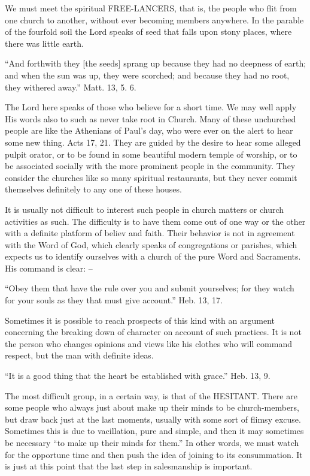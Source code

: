 \documentclass[
]{book}
\begin{document}
We must meet the spiritual FREE-LANCERS, that is, the people who flit from one church to another, without ever becoming members anywhere. In the parable of the fourfold soil the Lord speaks of seed that falls upon stony places, where there was little earth.

``And forthwith they {[}the seeds{]} sprang up because they had no deepness of earth; and when the sun was up, they were scorched; and because they had no root, they withered away.'' Matt. 13, 5. 6.

The Lord here speaks of those who believe for a short time. We may well apply His words also to such as never take root in Church. Many of these unchurched people are like the Athenians of Paul's day, who were ever on the alert to hear some new thing. Acts 17, 21. They are guided by the desire to hear some alleged pulpit orator, or to be found in some beautiful modern temple of worship, or to be associated socially with the more prominent people in the community. They consider the churches like so many spiritual restaurants, but they never commit themselves definitely to any one of these houses.

It is usually not difficult to interest such people in church matters or church activities as such. The difficulty is to have them come out of one way or the other with a definite platform of believ and faith. Their behavior is not in agreement with the Word of God, which clearly speaks of congregations or parishes, which expects us to identify ourselves with a church of the pure Word and Sacraments. His command is clear: --

``Obey them that have the rule over you and submit yourselves; for they watch for your souls as they that must give account.'' Heb. 13, 17.

Sometimes it is possible to reach prospects of this kind with an argument concerning the breaking down of character on account of such practices. It is not the person who changes opinions and views like his clothes who will command respect, but the man with definite ideas.

``It is a good thing that the heart be established with grace.'' Heb. 13, 9.

The most difficult group, in a certain way, is that of the HESITANT. There are some people who always just about make up their minds to be church-members, but draw back just at the last moments, usually with some sort of flimsy excuse. Sometimes this is due to vacillation, pure and simple, and then it may sometimes be necessary ``to make up their minds for them.'' In other words, we must watch for the opportune time and then push the idea of joining to its consummation. It is just at this point that the last step in salesmanship is important.
\end{document}
